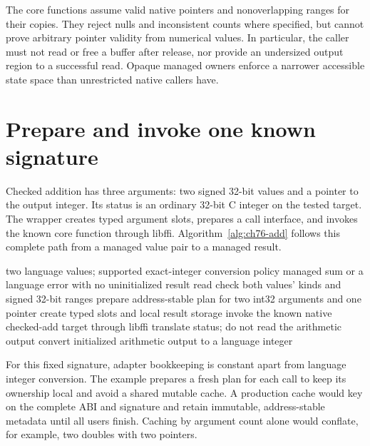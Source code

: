 The core functions assume valid native pointers and nonoverlapping ranges for their copies.
They reject nulls and inconsistent counts where specified, but cannot prove arbitrary pointer validity from numerical values.
In particular, the caller must not read or free a buffer after release, nor provide an undersized output region to a successful read.
Opaque managed owners enforce a narrower accessible state space than unrestricted native callers have.

\section{Prepare and invoke one known signature}
\label{sec:ch76-plan}
Checked addition has three arguments: two signed 32-bit values and a pointer to the output integer.
Its status is an ordinary 32-bit C integer on the tested target.
The wrapper creates typed argument slots, prepares a call interface, and invokes the known core function through libffi.
Algorithm~\ref{alg:ch76-add} follows this complete path from a managed value pair to a managed result.

\begin{algorithm}[htbp]
\caption{Execute checked managed addition through the scalar foreign-call bridge.}
\label{alg:ch76-add}
\begin{pseudocode}
\Require two language values; supported exact-integer conversion policy
\Ensure managed sum or a language error with no uninitialized result read
\State check both values' kinds and signed 32-bit ranges
\State prepare address-stable plan for two int32 arguments and one pointer
\State create typed slots and local result storage
\State invoke the known native checked-add target through libffi
  \State translate status; do not read the arithmetic output
\Else
  \State convert initialized arithmetic output to a language integer
\EndIf
\end{pseudocode}
\end{algorithm}

For this fixed signature, adapter bookkeeping is constant apart from language integer conversion.
The example prepares a fresh plan for each call to keep its ownership local and avoid a shared mutable cache.
A production cache would key on the complete ABI and signature and retain immutable, address-stable metadata until all users finish.
Caching by argument count alone would conflate, for example, two doubles with two pointers.

